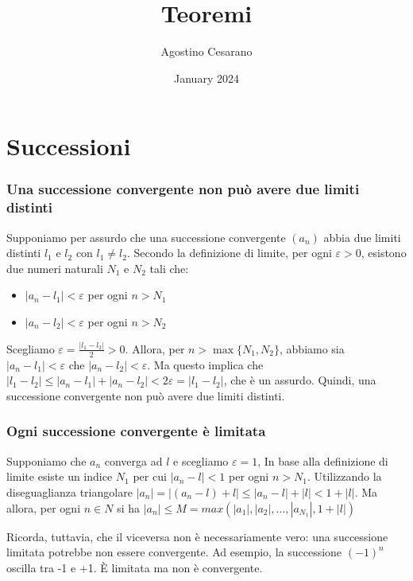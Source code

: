 \documentclass{article}
\title{Teoremi}
\author{Agostino Cesarano}
\date{January 2024}
\begin{document}
\maketitle

\part{Successioni}
\section{Una successione convergente non può avere due limiti distinti}
Supponiamo per assurdo che una successione convergente $(a_n)$ abbia due limiti distinti $l_1$ e $l_2$ con $l_1 \neq l_2$. Secondo la definizione di limite, per ogni $\varepsilon > 0$, esistono due numeri naturali $N_1$ e $N_2$ tali che:
\begin{itemize}
    \item $|a_n - l_1| < \varepsilon$ per ogni $n > N_1$
    \item $|a_n - l_2| < \varepsilon$ per ogni $n > N_2$
\end{itemize}


Scegliamo $\varepsilon = \frac{|l_1 - l_2|}{2} > 0$. Allora, per $n > \max\{N_1, N_2\}$, abbiamo sia $|a_n - l_1| < \varepsilon$ che $|a_n - l_2| < \varepsilon$.
Ma questo implica che $|l_1 - l_2| \leq |a_n - l_1| + |a_n - l_2| < 2\varepsilon = |l_1 - l_2|$, che è un assurdo. Quindi, una successione convergente non può avere due limiti distinti.

\section{Ogni successione convergente è limitata}
Supponiamo che $a_n$ converga ad $l$ e scegliamo $\varepsilon = 1$, In base alla definizione di limite esiste un indice $N_1$ per cui $|a_n - l| < 1$ per ogni $n > N_1$.
Utilizzando la diseguaglianza triangolare $|a_n| = |(a_n - l) + l| \le |a_n - l| + |l| < 1 + |l|$. Ma allora, per ogni $n \in N$ si ha $|a_n| \le M = max(|a_1|,|a_2|,...,|a_{N_1}|, 1 + |l|)$
\begin{calloutbox}
    Ricorda, tuttavia, che il viceversa non è necessariamente vero: una successione limitata potrebbe non essere convergente. Ad esempio, la successione $(-1)^n$ oscilla tra -1 e +1. È limitata ma non è convergente.
\end{calloutbox}
\newpage
\end{document}
